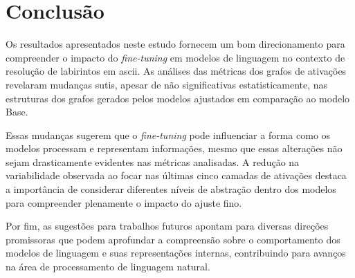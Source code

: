 \section{Conclusão}

Os resultados apresentados neste estudo fornecem um bom direcionamento para compreender o impacto do \textit{fine-tuning} em modelos de linguagem no contexto de resolução de labirintos em \gls{ascii}. As análises das métricas dos grafos de ativações revelaram mudanças sutis, apesar de não significativas estatisticamente, nas estruturas dos grafos gerados pelos modelos ajustados em comparação ao modelo Base.

Essas mudanças sugerem que o \textit{fine-tuning} pode influenciar a forma como os modelos processam e representam informações, mesmo que essas alterações não sejam drasticamente evidentes nas métricas analisadas. A redução na variabilidade observada ao focar nas últimas cinco camadas de ativações destaca a importância de considerar diferentes níveis de abstração dentro dos modelos para compreender plenamente o impacto do ajuste fino.

Por fim, as sugestões para trabalhos futuros apontam para diversas direções promissoras que podem aprofundar a compreensão sobre o comportamento dos modelos de linguagem e suas representações internas, contribuindo para avanços na área de processamento de linguagem natural.